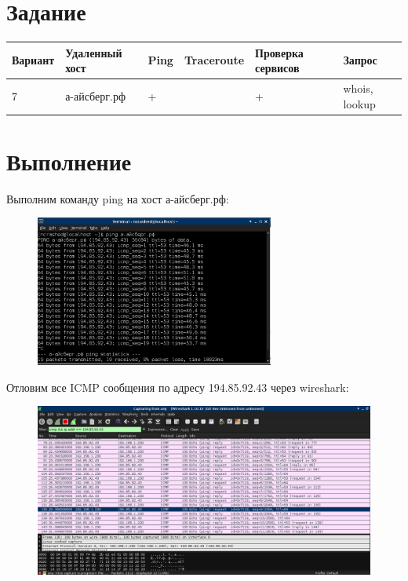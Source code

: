 \documentclass[russian,utf8,emptystyle]{eskdtext}
\begin{document}
\maketitle
%

\tableofcontents
\clearpage

\section{Задание}

\begin{longtable}{p{2cm}|p{5cm}|p{1cm}|p{2cm}|p{2cm}|p{1.5cm}}
Вариант & Удаленный хост & Ping & Traceroute & Проверка сервисов & Запрос \\
\hline
7       & а-айсберг.рф   & +    &            & +                 & whois, lookup      \\
\end{longtable}

\section{Выполнение}
Выполним команду ping на хост а-айсберг.рф:
\begin{figure}[h!]
\centering
\includegraphics[width=0.7\textwidth]{001}
\end{figure}

Отловим все ICMP сообщения по адресу 194.85.92.43 через wireshark:
\begin{figure}[h!]
\centering
\includegraphics[width=1.0\textwidth]{002}
\end{figure}
\end{document}
